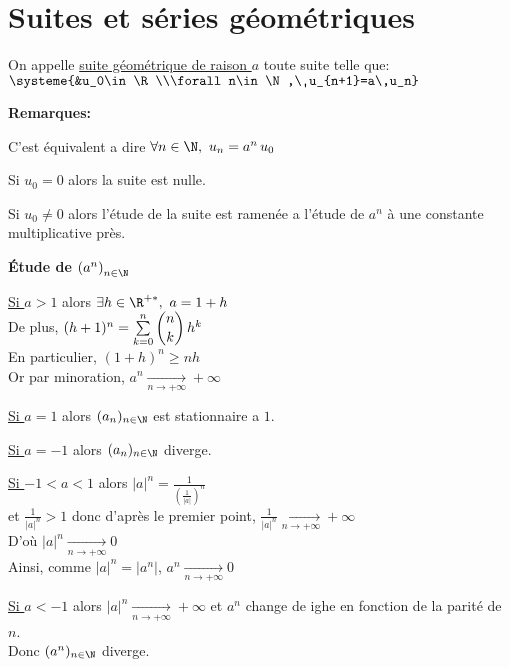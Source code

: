 \documentclass[12pt,twoside,a4paper]{article}
\author{MPSI 2}
\begin{document}
	\maketitle
	\section{Suites et séries géométriques}
		\begin{defi}
			On appelle \underline{suite géométrique de raison $a$} toute suite telle que:\\
			$\systeme{&u_0\in\R\\\forall n\in\N,\ u_{n+1}=a\,u_n}$
		\end{defi}
		\begin{flushleft}
			\textbf{Remarques:}
			\begin{liste}
				\item C'est équivalent a dire $\forall n\in\N,\ u_n=a^n\,u_0$
				\item Si $u_0=0$ alors la suite est nulle.
				\item Si $u_0\neq 0$ alors l'étude de la suite est ramenée a l'étude de $a^n$ \`a une constante multiplicative près.
			\end{liste}
		\end{flushleft}
		\begin{flushleft}
			\textbf{Étude de $\left(a^n\right)_{n\in\N}$}
			\begin{liste}
				\item \underline{Si $a>1$} alors $\exists h\in\R^{+*},\ a=1+h$\\
					De plus, $(h+1)^n=\sum\limits_{k=0}^{n}\dbinom{n}{k}\,h^k$\\
					En particulier, $(1+h)^n\geqslant nh$\\
					Or par minoration, $a^n\mathop{\longrightarrow}\limits_{n\rightarrow+\infty}+\infty$
				\item \underline{Si $a=1$} alors $(a_n)_{n\in\N}$ est stationnaire a $1$.
				\item \underline{Si $a=-1$} alors $(a_n)_{n\in\N}$ diverge.
				\item \underline{Si $-1<a<1$} alors $|a|^n=\frac{1}{\left(\frac{1}{|a|}\right)^n}$\\
					et $\frac{1}{|a|^n}>1$ donc d'après le premier point, $\frac1{|a|^n}\mathop{\longrightarrow}\limits_{n\rightarrow+\infty}+\infty$\\
					D'o\`u $|a|^n\mathop{\longrightarrow}\limits_{n\rightarrow+\infty}0$\\
					Ainsi, comme $|a|^n=|a^n|$, $a^n\mathop{\longrightarrow}\limits_{n\rightarrow+\infty}0$
				\item \underline{Si $a<-1$} alors $|a|^n\mathop{\longrightarrow}\limits_{n\rightarrow+\infty}+\infty$ et $a^n$ change de ighe en fonction de la parité de $n$.\\
					Donc $(a^n)_{n\in\N}$ diverge.
			\end{liste}
		\end{flushleft}
\end{document}
